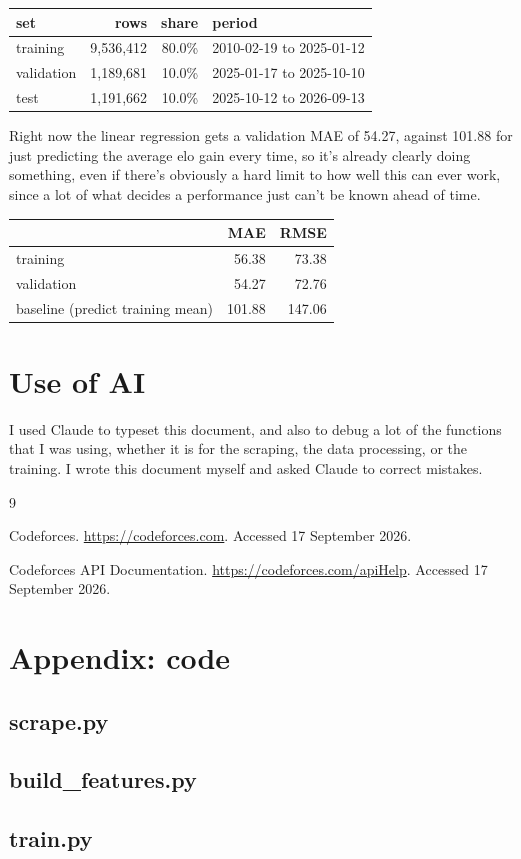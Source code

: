 \documentclass[11pt,a4paper]{article}
\begin{document}
\begin{center}
\begin{tabular}{@{}lrrl@{}}
\toprule
set & rows & share & period \\
\midrule
training & 9,536,412 & 80.0\% & 2010-02-19 to 2025-01-12 \\
validation & 1,189,681 & 10.0\% & 2025-01-17 to 2025-10-10 \\
test & 1,191,662 & 10.0\% & 2025-10-12 to 2026-09-13 \\
\bottomrule
\end{tabular}
\end{center}

Right now the linear regression gets a validation MAE of 54.27, against 101.88 for just predicting the average elo gain every time, so it's already clearly doing something, even if there's obviously a hard limit to how well this can ever work, since a lot of what decides a performance just can't be known ahead of time.

\begin{center}
\begin{tabular}{@{}lrr@{}}
\toprule
 & MAE & RMSE \\
\midrule
training & 56.38 & 73.38 \\
validation & 54.27 & 72.76 \\
baseline (predict training mean) & 101.88 & 147.06 \\
\bottomrule
\end{tabular}
\end{center}

\section*{Use of AI}

I used Claude to typeset this document, and also to debug a lot of the functions that I was using, whether it is for the scraping, the data processing, or the training. I wrote this document myself and asked Claude to correct mistakes.

\begin{thebibliography}{9}

Codeforces.
\url{https://codeforces.com}.
Accessed 17 September 2026.

Codeforces API Documentation.
\url{https://codeforces.com/apiHelp}.
Accessed 17 September 2026.

\end{thebibliography}

\newpage
\section*{Appendix: code}

\subsection*{scrape.py}


\subsection*{build\_features.py}


\subsection*{train.py}

\end{document}
